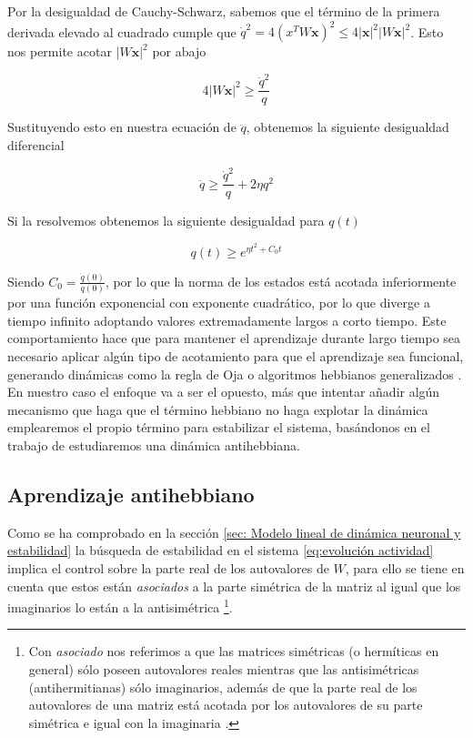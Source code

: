 \documentclass[11pt,a4paper,twoside,pdf]{article}
\numberwithin{equation}{section}
\begin{document}
Por la desigualdad de Cauchy-Schwarz, sabemos que el término de la primera derivada elevado al cuadrado cumple que \(\dot{q}^2 = 4(x^TW\mathbf{x})^2 \le 4|\mathbf{x}|^2|W\mathbf{x}|^2\). Esto nos permite acotar \(|W\mathbf{x}|^2\) por abajo

\begin{equation}
  4|W\mathbf{x}|^2 \ge \frac{\dot{q}^2}{q}
\end{equation}

Sustituyendo esto en nuestra ecuación de \(\ddot{q}\), obtenemos la siguiente desigualdad diferencial

\begin{equation}
  \ddot{q} \ge \frac{\dot{q}^2}{q} + 2\eta q^2
\end{equation}

Si la resolvemos obtenemos la siguiente desigualdad para \(q(t)\)

\begin{equation}
  q(t) \ge e^{\eta t^2 + C_0 t}
\end{equation}

Siendo \(C_0 = \frac{\dot{q}(0)}{q(0)}\), por lo que la norma de los estados está acotada inferiormente por una función exponencial con exponente cuadrático, por lo que diverge a tiempo infinito adoptando valores extremadamente largos a corto tiempo. Este comportamiento hace que para mantener el aprendizaje durante largo tiempo sea necesario aplicar algún tipo de acotamiento para que el aprendizaje sea funcional, generando dinámicas como la regla de Oja \parencite{oja1982} o algoritmos hebbianos generalizados \parencite{sanger1989}. En nuestro caso el enfoque va a ser el opuesto, más que intentar añadir algún mecanismo que haga que el término hebbiano no haga explotar la dinámica emplearemos el propio término para estabilizar el sistema, basándonos en el trabajo de \textcite{magnasco2009} estudiaremos una dinámica antihebbiana.

\subsection{Aprendizaje antihebbiano}
Como se ha comprobado en la sección \ref{sec: Modelo lineal de dinámica neuronal y estabilidad} la búsqueda de estabilidad en el sistema \eqref{eq:evolución actividad} implica el control sobre la parte real de los autovalores de \(W\), para ello se tiene en cuenta que estos están \emph{asociados} a la parte simétrica de la matriz al igual que los imaginarios lo están a la antisimétrica \footnote{Con \emph{asociado} nos referimos a que las matrices simétricas (o hermíticas en general) sólo poseen autovalores reales mientras que las antisimétricas (antihermitianas) sólo imaginarios, además de que la parte real de los autovalores de una matriz está acotada por los autovalores de su parte simétrica e igual con la imaginaria \parencite{bendixson1902}.}.
\end{document}
